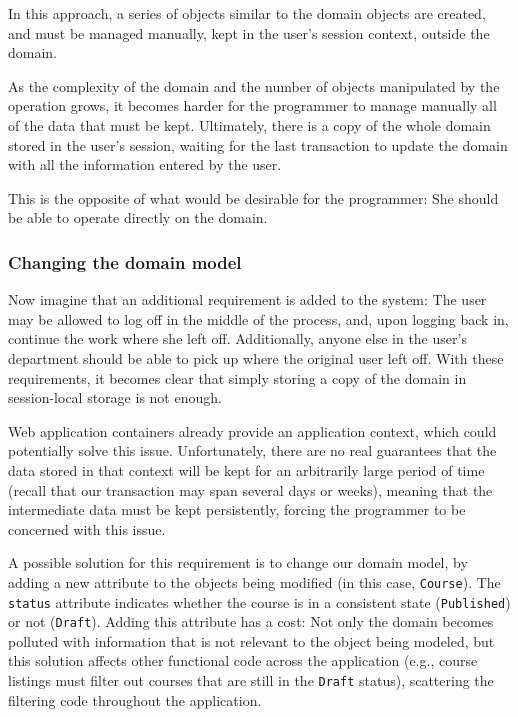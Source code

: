 \documentclass{llncs}
\begin{document}
In this approach, a series of objects similar to the domain objects
are created, and must be managed manually, kept in the user's session
context, outside the domain.

As the complexity of the domain and the number of objects manipulated
by the operation grows, it becomes harder for the programmer to manage
manually all of the data that must be kept. Ultimately, there is a
copy of the whole domain stored in the user's session, waiting for the
last transaction to update the domain with all the information entered
by the user.

This is the opposite of what would be desirable for the programmer:
She should be able to operate directly on the domain.

\subsubsection{Changing the domain model}

Now imagine that an additional requirement is added to the system: The
user may be allowed to log off in the middle of the process, and, upon
logging back in, continue the work where she left off. Additionally,
anyone else in the user's department should be able to pick up where
the original user left off. With these requirements, it becomes clear
that simply storing a copy of the domain in session-local storage is
not enough.

Web application containers already provide an application context,
which could potentially solve this issue. Unfortunately, there are no
real guarantees that the data stored in that context will be kept for
an arbitrarily large period of time (recall that our transaction may
span several days or weeks), meaning that the intermediate data must
be kept persistently, forcing the programmer to be concerned with this
issue.

A possible solution for this requirement is to change our domain
model, by adding a new attribute to the objects being modified (in
this case, \texttt{Course}). The \texttt{status} attribute
indicates whether the course is in a consistent state
(\texttt{Published}) or not (\texttt{Draft}). Adding this attribute
has a cost: Not only the domain becomes polluted with information that
is not relevant to the object being modeled, but this solution affects
other functional code across the application (e.g., course listings
must filter out courses that are still in the \texttt{Draft} status),
scattering the filtering code throughout the application.
\end{document}
